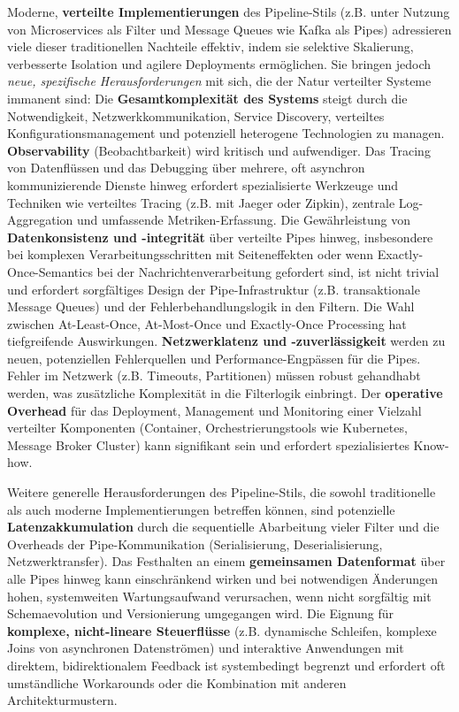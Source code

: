 \documentclass[10pt]{article}
\begin{document}
\begin{multicols}{2}
Moderne, \textbf{verteilte Implementierungen} des Pipeline-Stils (z.B. unter Nutzung von Microservices als Filter und Message Queues wie Kafka als Pipes) adressieren viele dieser traditionellen Nachteile effektiv, indem sie selektive Skalierung, verbesserte Isolation und agilere Deployments ermöglichen.\cite{researchgate_etl_dist} Sie bringen jedoch \textit{neue, spezifische Herausforderungen} mit sich, die der Natur verteilter Systeme immanent sind:
Die \textbf{Gesamtkomplexität des Systems} steigt durch die Notwendigkeit, Netzwerkkommunikation, Service Discovery, verteiltes Konfigurationsmanagement und potenziell heterogene Technologien zu managen.
\textbf{Observability} (Beobachtbarkeit) wird kritisch und aufwendiger. Das Tracing von Datenflüssen und das Debugging über mehrere, oft asynchron kommunizierende Dienste hinweg erfordert spezialisierte Werkzeuge und Techniken wie verteiltes Tracing (z.B. mit Jaeger oder Zipkin), zentrale Log-Aggregation und umfassende Metriken-Erfassung.
Die Gewährleistung von \textbf{Datenkonsistenz und -integrität} über verteilte Pipes hinweg, insbesondere bei komplexen Verarbeitungsschritten mit Seiteneffekten oder wenn Exactly-Once-Semantics bei der Nachrichtenverarbeitung gefordert sind, ist nicht trivial und erfordert sorgfältiges Design der Pipe-Infrastruktur (z.B. transaktionale Message Queues) und der Fehlerbehandlungslogik in den Filtern. Die Wahl zwischen At-Least-Once, At-Most-Once und Exactly-Once Processing hat tiefgreifende Auswirkungen.
\textbf{Netzwerklatenz und -zuverlässigkeit} werden zu neuen, potenziellen Fehlerquellen und Performance-Engpässen für die Pipes. Fehler im Netzwerk (z.B. Timeouts, Partitionen) müssen robust gehandhabt werden, was zusätzliche Komplexität in die Filterlogik einbringt.
Der \textbf{operative Overhead} für das Deployment, Management und Monitoring einer Vielzahl verteilter Komponenten (Container, Orchestrierungstools wie Kubernetes, Message Broker Cluster) kann signifikant sein und erfordert spezialisiertes Know-how.

Weitere generelle Herausforderungen des Pipeline-Stils, die sowohl traditionelle als auch moderne Implementierungen betreffen können, sind potenzielle \textbf{Latenzakkumulation} durch die sequentielle Abarbeitung vieler Filter und die Overheads der Pipe-Kommunikation (Serialisierung, Deserialisierung, Netzwerktransfer).\cite{richards2020} Das Festhalten an einem \textbf{gemeinsamen Datenformat} über alle Pipes hinweg kann einschränkend wirken und bei notwendigen Änderungen hohen, systemweiten Wartungsaufwand verursachen, wenn nicht sorgfältig mit Schemaevolution und Versionierung umgegangen wird.\cite{richards2020} Die Eignung für \textbf{komplexe, nicht-lineare Steuerflüsse} (z.B. dynamische Schleifen, komplexe Joins von asynchronen Datenströmen) und interaktive Anwendungen mit direktem, bidirektionalem Feedback ist systembedingt begrenzt und erfordert oft umständliche Workarounds oder die Kombination mit anderen Architekturmustern.\cite{uqcloud_pipeline}


\end{multicols}
\end{document}
